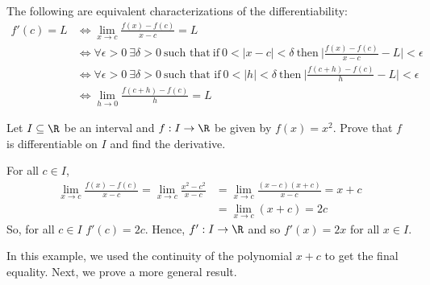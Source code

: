 \begin{remark}
    The following are equivalent characterizations of the differentiability:
    \begin{align*}
        f'(c) = L &\iff \lim_{ x \to c }  \frac{ f(x) - f(c) }{ x - c  }  = L  \\
                  &\iff \forall \epsilon > 0 \ \exists \delta > 0 \ \text{such that} \ \text{if} \ 0 < | x - c  | < \delta \ \text{then} \ \Big| \frac{ f(x) - f(c) }{ x - c  }  - L  \Big|  < \epsilon \\
                  &\iff \forall \epsilon > 0 \ \exists \delta > 0 \ \text{such that if} \ 0 < | h  |  < \delta \ \text{then} \ \Big| \frac{ f(c+h) - f(c) }{  h  }  - L  \Big|  < \epsilon \\
                  &\iff \lim_{ h \to 0 }  \frac{ f(c+h) - f(c) }{  h  }  = L 
    \end{align*}
\end{remark}

\begin{eg}
    Let \( I \subseteq  \R   \) be an interval and \( f: I \to \R  \) be given by \( f(x) = x^{2} \). Prove that \( f  \) is differentiable on \( I  \) and find the derivative. 

    For all \( c \in I  \), 
    \begin{align*} 
        \lim_{ x \to c  }  \frac{ f(x) - f(c) }{ x - c  } = \lim_{ x \to c  }  \frac{ x^{2} - c^{2} }{  x - c  }  &= \lim_{ x \to c  }  \frac{ (x - c ) (x + c) }{  x - c  }  =  x + c  \\
                                                                                                                  &= \lim_{ x \to c } (x + c) = 2c
    \end{align*}
    So, for all \( c \in I  \) \( f'(c) = 2c  \). Hence, \( f': I \to \R  \) and so \( f'(x) = 2x  \) for all \( x \in  I \).
\end{eg}

In this example, we used the continuity of the polynomial \( x + c  \) to get the final equality. Next, we prove a more general result.

